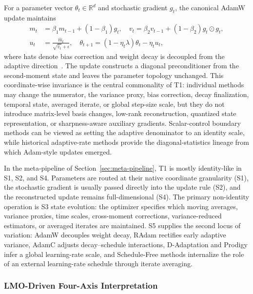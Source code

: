 For a parameter vector
$\theta_t \in \mathbb{R}^d$ and stochastic gradient $g_t$, the canonical
AdamW update maintains
\begin{align}
  m_t &= \beta_1 m_{t-1} + (1-\beta_1) g_t, \quad v_t = \beta_2 v_{t-1} + (1-\beta_2) g_t \odot g_t, \\
  u_t &= \frac{\hat{m}_t}{\sqrt{\hat{v}_t}+\epsilon}, \quad
  \theta_{t+1} = (1-\eta_t \lambda)\theta_t - \eta_t u_t,
  \label{eq:t1-adamw-template}
\end{align}
where hats denote bias correction and weight decay is decoupled from the
adaptive direction~\citep{kingma2015adam,loshchilov2019decoupled}.  The update
constructs a diagonal preconditioner from the second-moment state and leaves
the parameter topology unchanged.  This coordinate-wise invariance is the
central commonality of T1: individual methods may change the numerator, the
variance proxy, bias correction, decay finalization, temporal state, averaged
iterate, or global step-size scale, but they do not introduce matrix-level
basis changes, low-rank reconstruction, quantized state representation, or
sharpness-aware auxiliary gradients.  Scalar-control boundary methods can be
viewed as setting the adaptive denominator to an identity scale, while
historical adaptive-rate methods provide the diagonal-statistics lineage from
which Adam-style updates emerged.

In the meta-pipeline of Section~\ref{sec:meta-pipeline}, T1 is mostly
identity-like in S1, S2, and S4.  Parameters are routed at their native
coordinate granularity (S1), the stochastic gradient is usually passed directly
into the update rule (S2), and the reconstructed update remains
full-dimensional (S4).  The primary non-identity operation is S3 state
evolution: the optimizer specifies which moving averages, variance proxies,
time scales, cross-moment corrections, variance-reduced estimators, or
averaged iterates are maintained.  S5 supplies the second locus of variation:
AdamW decouples weight decay, RAdam rectifies early adaptive variance, AdamC
adjusts decay--schedule interactions, D-Adaptation and Prodigy infer a global
learning-rate scale, and Schedule-Free methods internalize the role of an
external learning-rate schedule through iterate averaging.

\subsubsection{LMO-Driven Four-Axis Interpretation}
\label{sec:t1-lmo-four-axis}

